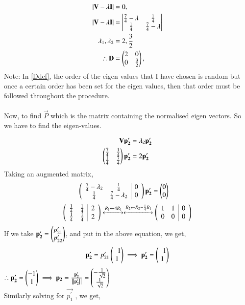 \documentclass[journal]{IEEEtran}
\begin{document}
	\begin{align}
		|\mathbf{V}  - \lambda\mathbf{I}|  &= 0,\\
		|\mathbf{V}  - \lambda\mathbf{I}|  &= \begin{vmatrix}\frac{7}{4} - \lambda& \frac{1}{4}\\ \frac{1}{4} & \frac{7}{4} - \lambda\end{vmatrix}\\
		\lambda_1, \lambda_2 &= 2 , \frac{3}{2} \\
		\therefore 	\mathbf{D} &= \begin{pmatrix}2 & 0 \\ 0 & \frac{3}{2}\end{pmatrix} , \label{Ddef}
	\end{align}
Note: In \eqref{Ddef}, the order of the eigen values that I have chosen is random but once a certain order has been set for the eigen values, then that order must be followed throughout the procedure. \\
\\
Now, to find $\vec{P}$ which is the matrix containing the normalised eigen vectors. So we have to find the eigen-values.



\begin{align}
	\mathbf{V}\mathbf{p_2^\prime} &= \lambda_2 \mathbf{p_2^\prime} \\
	\begin{pmatrix}\frac{7}{4} & \frac{1}{4} \\ \frac{1}{4} & \frac{7}{4}\end{pmatrix} \mathbf{p_2^\prime}  &= 2\mathbf{p_2^\prime} \\
\end{align}
Taking an augmented matrix,
\begin{align}
	\left(
	\begin{array}{cc|c}
		\frac{7}{4} - \lambda_2 & \frac{1}{4} & 0\\ 
		\frac{1}{4} & \frac{7}{4} - \lambda_2& 0
	\end{array}\right)\mathbf{p_2^\prime}  &=  \begin{pmatrix}0 \\ 0\end{pmatrix} 
\end{align}
\begin{align}
	\left(
	\begin{array}{cc|c}
		\frac{1}{4} & \frac{1}{4} & 2\\ 
		\frac{1}{4} & \frac{1}{4} & 2
	\end{array}\right)
	\xleftrightarrow[]{R_1 \leftarrow {4 R_1}}
	\xleftrightarrow[]{R_2 \leftarrow {R_2-\frac{1}{4}R_1}}
	\left(
	\begin{array}{cc|c}
		1 & 1 & 0\\ 
		0 & 0 & 0
		\end{array}\right)
\end{align}
If we take $\mathbf{p_2^\prime}  = \begin{pmatrix}p_{21}^\prime \\ p_{22}^\prime\end{pmatrix}$, and put in the above equation, we get,
\begin{align}
	\mathbf{p_2^\prime} = p_{21}^\prime \begin{pmatrix}-1 \\ 1\end{pmatrix} \implies \mathbf{p_2^\prime} =  \begin{pmatrix}-1 \\ 1\end{pmatrix}
\end{align}
$\therefore \mathbf{p_2^\prime}  = \begin{pmatrix}-1 \\ 1\end{pmatrix} \implies \mathbf{p_2} = \frac{\mathbf{p_2^\prime} }{\left\lVert\mathbf{p_2^\prime}\right\rVert}  = \begin{pmatrix} -\frac{1}{\sqrt{2}} \\ \frac{1}{\sqrt{2}}\end{pmatrix}$ \\
Similarly solving for $\vec{p_1^\prime}$ , we get,
\end{document}
